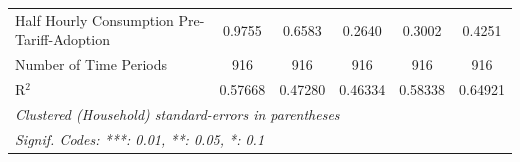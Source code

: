 \begin{table}[htbp]
\begin{tabular}{lccccc}
      Half Hourly Consumption Pre-Tariff-Adoption & 0.9755           & 0.6583             & 0.2640          & 0.3002          & 0.4251\\  
      Number of Time Periods                      & 916              & 916                & 916             & 916             & 916\\  
      R$^2$                                       & 0.57668          & 0.47280            & 0.46334         & 0.58338         & 0.64921\\  
      \midrule \midrule
      \multicolumn{6}{l}{\emph{Clustered (Household) standard-errors in parentheses}}\\
      \multicolumn{6}{l}{\emph{Signif. Codes: ***: 0.01, **: 0.05, *: 0.1}}\\
   \end{tabular}
\end{table}


